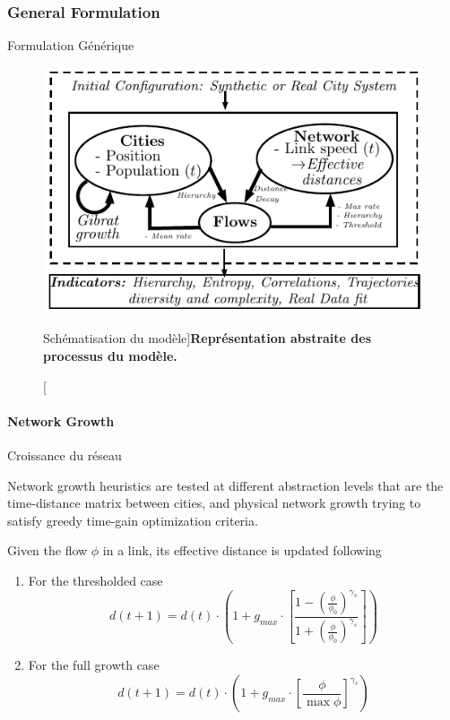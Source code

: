 \subsubsection{General Formulation}{Formulation Générique}




\begin{figure}
\includegraphics[width=\linewidth]{Figures/MacroCoEvolModel/model}
\caption[][Schématisation du modèle]{}{\textbf{Représentation abstraite des processus du modèle.}\label{fig:macrocoevolmodel:model}}
\end{figure}








\paragraph{Network Growth}{Croissance du réseau}



Network growth heuristics are tested at different abstraction levels that are the time-distance matrix between cities, and physical network growth trying to satisfy greedy time-gain optimization criteria.

Given the flow $\phi$ in a link, its effective distance is updated following

\begin{enumerate}
\item For the thresholded case
\[
d(t+1) = d(t)\cdot \left( 1 + g_{max} \cdot \left[\frac{1 - \left(\frac{\phi}{\phi_0}\right)^{\gamma_s}}{1 + \left(\frac{\phi}{\phi_0}\right)^{\gamma_s}}\right]\right)
\]
\item For the full growth case
\[
d(t+1) = d(t)\cdot \left(1 + g_{max} \cdot \left[\frac{\phi}{\max \phi}\right]^{\gamma_s}\right)
\]
\end{enumerate}

